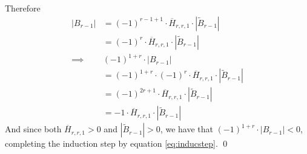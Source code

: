 \documentclass[a4paper,12pt]{article}
\renewenvironment{proof}{{\textit{Proof} \\}}{\qed}
\begin{document}
\begin{proof}
Therefore
\begin{align*}
    |B_{r-1}| &= (-1)^{r-1+1} \cdot \overline{H}_{r,r,1} \cdot |\tilde{B}_{r-1}| \\
    &=(-1)^{r} \cdot \overline{H}_{r,r,1} \cdot |\tilde{B}_{r-1}| \\
    \implies  &(-1)^{1+r} \cdot |B_{r-1}| \\
    &=  (-1)^{1+r} \cdot (-1)^{r} \cdot \overline{H}_{r,r,1} \cdot |\tilde{B}_{r-1}| \\
    &= (-1)^{2r + 1} \cdot \overline{H}_{r,r,1} \cdot |\tilde{B}_{r-1}| \\
    &= -1 \cdot \overline{H}_{r,r,1} \cdot |\tilde{B}_{r-1}|
\end{align*}
And since both $\overline{H}_{r,r,1} > 0$ and $|\tilde{B}_{r-1}| > 0$, we have that
$(-1)^{1+r} \cdot |B_{r-1}| < 0$, completing the induction step by equation \eqref{eq:inducstep}.
\end{proof}
\end{document}
